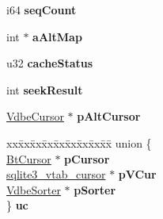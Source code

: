 \begin{DoxyCompactItemize}
i64 {\bfseries seq\+Count}
\item 
\mbox{\label{struct_vdbe_cursor_a78b9a4b46b24e0f7a6b6b58e1e51c2ac}} 
int $\ast$ {\bfseries a\+Alt\+Map}
\item 
\mbox{\label{struct_vdbe_cursor_acf243b5a94a6e5a11341d6fece473c00}} 
u32 {\bfseries cache\+Status}
\item 
\mbox{\label{struct_vdbe_cursor_a5eff86e2a9c87dc15956ad362aa03f05}} 
int {\bfseries seek\+Result}
\item 
\mbox{\label{struct_vdbe_cursor_acc57fe0cffe660d0d08ac422dfa20af5}} 
\mbox{\hyperlink{struct_vdbe_cursor}{Vdbe\+Cursor}} $\ast$ {\bfseries p\+Alt\+Cursor}
\item 
\mbox{\label{struct_vdbe_cursor_a09d22a6982241878199f55c72cc0e6e4}} 
\begin{tabbing}
xx\=xx\=xx\=xx\=xx\=xx\=xx\=xx\=xx\=\kill
union \{\\
\>\mbox{\hyperlink{struct_bt_cursor}{BtCursor}} $\ast$ {\bfseries pCursor}\\
\>\mbox{\hyperlink{structsqlite3__vtab__cursor}{sqlite3\_vtab\_cursor}} $\ast$ {\bfseries pVCur}\\
\>\mbox{\hyperlink{struct_vdbe_sorter}{VdbeSorter}} $\ast$ {\bfseries pSorter}\\
\} {\bfseries uc}\\


\end{tabbing}
\end{DoxyCompactItemize}
